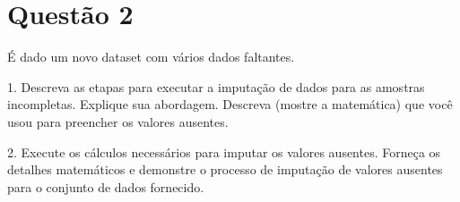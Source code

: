 \section{Questão 2}
É dado um novo dataset com vários dados faltantes.

1. Descreva as etapas para executar a imputação de dados para as amostras incompletas. Explique sua abordagem. Descreva (mostre a matemática) que você usou para preencher os valores ausentes.

2. Execute os cálculos necessários para imputar os valores ausentes. Forneça os detalhes matemáticos e demonstre o processo de imputação de valores ausentes para o conjunto de dados fornecido.
